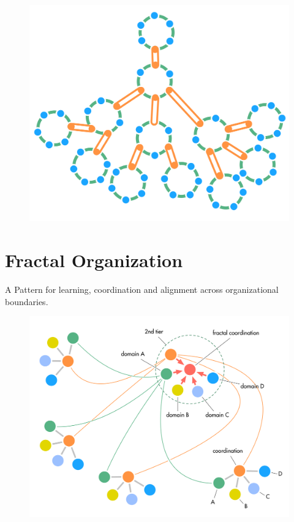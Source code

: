 \begin{figure}[htbp]
\centering
\includegraphics[keepaspectratio,width=\textwidth,height=0.75\textheight]{img/structural-patterns/double-linked-hierarchy.png}
\end{figure}

\section{Fractal Organization}
\label{fractalorganization}

A Pattern for learning, coordination and alignment across organizational boundaries.

\begin{figure}[htbp]
\centering
\includegraphics[keepaspectratio,width=\textwidth,height=0.75\textheight]{img/structural-patterns/fractal-organization.png}
\end{figure}

